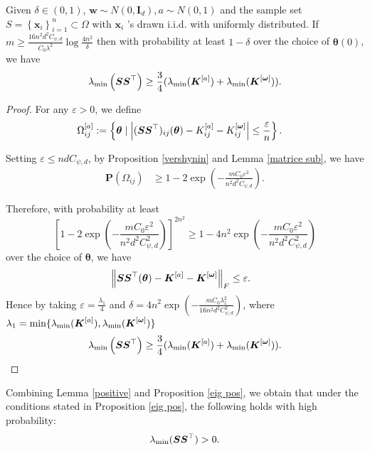 \begin{proposition}\label{eig pos}
    Given $\delta \in(0,1)$, $\boldsymbol{w} \sim N\left(0, \boldsymbol{I}_d\right), a \sim N(0,1)$ and the sample set $S=\left\{\boldsymbol{x}_i \right\}_{i=1}^n \subset \Omega$ with $\boldsymbol{x}_i$ 's drawn i.i.d. with uniformly distributed. If $m \geq \frac{16 n^2 d^2 C_{\psi, d}}{C_0 \lambda^2} \log \frac{4 n^2}{\delta}$ then with probability at least $1-\delta$ over the choice of $\boldsymbol{\theta}(0)$, we have
$$
\lambda_{\min }\left(\boldsymbol{S}\boldsymbol{S}^\top\right)\geq\frac{3}{4}(\lambda_{\text{min}}(\boldsymbol{K}^{[a]})+\lambda_{\text{min}}(\boldsymbol{K}^{[\boldsymbol{\omega}]})).
$$
\end{proposition}
\begin{proof}
    For any $\varepsilon>0$, we define \begin{align}
        \Omega_{ij}^{[a]}&:=\left\{\boldsymbol{\theta}\mid \left|(\boldsymbol{S}\boldsymbol{S}^\top)_{ij}(\boldsymbol{\theta})-K_{ij}^{[a]}-K_{ij}^{[\boldsymbol{\omega}]}\right|\le\frac{\varepsilon}{n}\right\}.
    \end{align}

    Setting $\varepsilon\le ndC_{\psi,d}$, by Proposition \ref{vershynin} and Lemma \ref{matrice sub}, we have \begin{align}
        \mathbf{P}(\Omega_{ij})&\ge 1-2\exp\left(-\frac{mC_0\varepsilon^2}{n^2d^2C_{\psi,d}}\right).
    \end{align}

    Therefore, with probability at least \[\left[1-2\exp\left(-\frac{mC_0\varepsilon^2}{n^2d^2C_{\psi,d}^2}\right)\right]^{2n^2}\ge 1-4n^2\exp\left(-\frac{mC_0\varepsilon^2}{n^2d^2C_{\psi,d}^2}\right)\] over the choice of $\boldsymbol{\theta}$, we have \begin{align}
        &\left\|\boldsymbol{S}\boldsymbol{S}^\top(\boldsymbol{\theta})-\boldsymbol{K}^{[a]}-\boldsymbol{K}^{[\boldsymbol{\omega}]}\right\|_F\le \varepsilon.
    \end{align}
Hence by taking $\varepsilon=\frac{\lambda_1}{4}$ and $\delta=4n^2\exp\left(-\frac{mC_0\lambda_1^2}{16n^2d^2C_{\psi,d}^2}\right)$, where $\lambda_1=\min\{\lambda_{\text{min}}(\boldsymbol{K}^{[a]}),\lambda_{\text{min}}(\boldsymbol{K}^{[\boldsymbol{\omega}]})\}$\begin{align}
       \lambda_{\min }\left(\boldsymbol{S}\boldsymbol{S}^\top\right)\geq\frac{3}{4}(\lambda_{\text{min}}(\boldsymbol{K}^{[a]})+\lambda_{\text{min}}(\boldsymbol{K}^{[\boldsymbol{\omega}]})).
    \end{align}
\end{proof}

Combining Lemma \ref{positive} and Proposition \ref{eig pos}, we obtain that under the conditions stated in Proposition \ref{eig pos}, the following holds with high probability:
\begin{equation}
    \lambda_{\text{min}}(\boldsymbol{S} \boldsymbol{S}^{\top}) > 0.
\end{equation}






